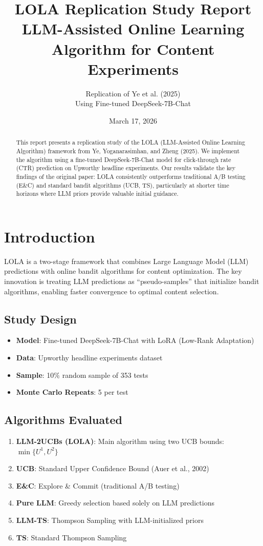 \documentclass[11pt,a4paper]{article}
\title{\textbf{LOLA Replication Study Report}\\
\large LLM-Assisted Online Learning Algorithm for Content Experiments}
\author{Replication of Ye et al. (2025)\\
Using Fine-tuned DeepSeek-7B-Chat}
\date{March 17, 2026}
\begin{document}
\maketitle

\begin{abstract}
This report presents a replication study of the LOLA (LLM-Assisted Online Learning Algorithm) framework from Ye, Yoganarasimhan, and Zheng (2025). We implement the algorithm using a fine-tuned DeepSeek-7B-Chat model for click-through rate (CTR) prediction on Upworthy headline experiments. Our results validate the key findings of the original paper: LOLA consistently outperforms traditional A/B testing (E\&C) and standard bandit algorithms (UCB, TS), particularly at shorter time horizons where LLM priors provide valuable initial guidance.
\end{abstract}

\section{Introduction}

LOLA is a two-stage framework that combines Large Language Model (LLM) predictions with online bandit algorithms for content optimization. The key innovation is treating LLM predictions as ``pseudo-samples'' that initialize bandit algorithms, enabling faster convergence to optimal content selection.

\subsection{Study Design}

\begin{itemize}
    \item \textbf{Model}: Fine-tuned DeepSeek-7B-Chat with LoRA (Low-Rank Adaptation)
    \item \textbf{Data}: Upworthy headline experiments dataset
    \item \textbf{Sample}: 10\% random sample of 353 tests
    \item \textbf{Monte Carlo Repeats}: 5 per test
\end{itemize}

\subsection{Algorithms Evaluated}

\begin{enumerate}
    \item \textbf{LLM-2UCBs (LOLA)}: Main algorithm using two UCB bounds: $\min\{U^1, U^2\}$
    \item \textbf{UCB}: Standard Upper Confidence Bound (Auer et al., 2002)
    \item \textbf{E\&C}: Explore \& Commit (traditional A/B testing)
    \item \textbf{Pure LLM}: Greedy selection based solely on LLM predictions
    \item \textbf{LLM-TS}: Thompson Sampling with LLM-initialized priors
    \item \textbf{TS}: Standard Thompson Sampling
\end{enumerate}
\end{document}
